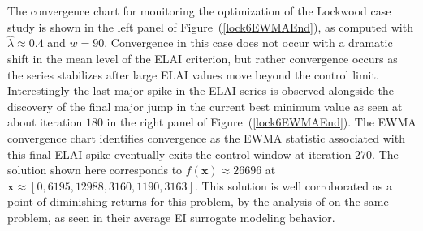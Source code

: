\documentclass[12pt]{article}
\def \lockLamb {
        0.4
}
\begin{document}
%
%

%
The convergence chart for monitoring the optimization of the Lockwood case study is shown in the left panel of Figure~(\ref{lock6EWMAEnd}), as computed with $\hat\lambda\approx\lockLamb$ and $w=90$. %
%
Convergence in this case does not occur with a dramatic shift in the mean level of the ELAI criterion, but rather convergence occurs as the series stabilizes after large ELAI values move beyond the control limit. %
%
Interestingly the last major spike in the ELAI series is observed alongside the discovery of the final major jump in the current best minimum value as seen at about iteration $180$ in the right panel of Figure~(\ref{lock6EWMAEnd}).
%
The EWMA convergence chart identifies convergence as the EWMA statistic associated with this final ELAI spike eventually exits the control window at iteration $270$.
%
The solution shown here corresponds to $f(\bm{x})\approx26696$ at $\bm{x}\approx[0, 6195, 12988, 3160, 1190, 3163]$.
%
This solution is well corroborated as a point of diminishing returns for this problem, by the analysis of \cite{gramacy2014} on the same problem, as seen in their average EI surrogate modeling behavior. %


%
%
\end{document}
